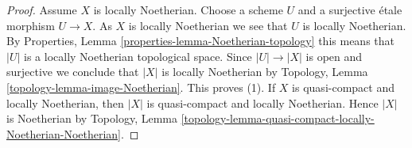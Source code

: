 \documentclass[10pt,a4paper]{amsart}
\theoremstyle{plain}
\theoremstyle{definition}
\theoremstyle{remark}
\numberwithin{equation}{subsection}
\begin{document}
\begin{proof}
Assume $X$ is locally Noetherian.
Choose a scheme $U$ and a surjective \'etale morphism
$U \to X$. As $X$ is locally Noetherian we see that $U$ is locally
Noetherian. By
Properties, Lemma \ref{properties-lemma-Noetherian-topology}
this means that $|U|$ is a locally Noetherian topological space.
Since $|U| \to |X|$ is open and surjective we conclude that
$|X|$ is locally Noetherian by
Topology, Lemma \ref{topology-lemma-image-Noetherian}.
This proves (1). If $X$ is quasi-compact and locally Noetherian,
then $|X|$ is quasi-compact and locally Noetherian. Hence $|X|$
is Noetherian by
Topology,
Lemma \ref{topology-lemma-quasi-compact-locally-Noetherian-Noetherian}.
\end{proof}
\end{document}
